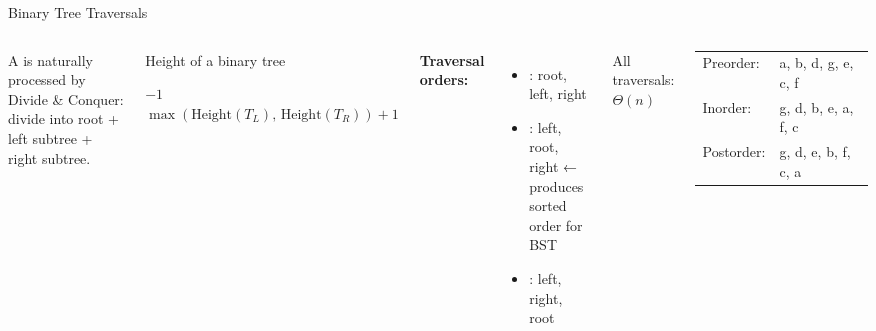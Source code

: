 \documentclass[aspectratio=169]{beamer}
\begin{document}
\begin{frame}[shrink=12]{Binary Tree Traversals}
  \begin{columns}[T]
      A  is naturally processed by Divide \& Conquer:
      divide into root + left subtree + right subtree.

      \vspace{0.4em}
      \begin{block}{Height of a binary tree}
        \begin{algorithmic}[1]
           \Return $-1$ \EndIf
          \State \Return $\max(\text{Height}(T_L),\,\text{Height}(T_R)) + 1$
        \end{algorithmic}
      \end{block}

      \textbf{Traversal orders:}
      \begin{itemize}
        \item {}: root, left, right
        \item {}: left, root, right ← produces sorted order for BST
        \item {}: left, right, root
      \end{itemize}
      All traversals: $\Theta(n)$
      \vspace{0.2em}
      \begin{tabular}{ll}
        Preorder:  & a, b, d, g, e, c, f \\
        Inorder:   & g, d, b, e, a, f, c \\
        Postorder: & g, d, e, b, f, c, a \\
      \end{tabular}
  \end{columns}
\end{frame}
\end{document}
